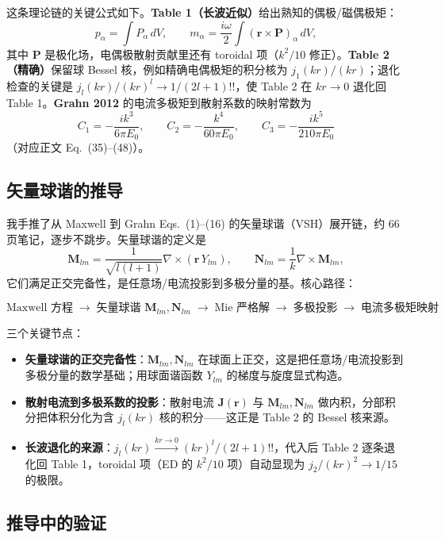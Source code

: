 这条理论链的关键公式如下。\textbf{Table 1（长波近似）}给出熟知的偶极/磁偶极矩：
\[
p_\alpha = \int P_\alpha\,dV,\qquad
m_\alpha = \frac{i\omega}{2}\int (\mathbf r\times\mathbf P)_\alpha\,dV,
\]
其中 $\mathbf P$ 是极化场，电偶极散射贡献里还有 toroidal 项（$k^2/10$ 修正）。\textbf{Table 2（精确）}保留球 Bessel 核，例如精确电偶极矩的积分核为 $j_1(kr)/(kr)$；退化检查的关键是 $j_l(kr)/(kr)^l\to1/(2l+1)!!$，使 Table 2 在 $kr\to0$ 退化回 Table 1。\textbf{Grahn 2012} 的电流多极矩到散射系数的映射常数为
\[
C_1=-\frac{ik^3}{6\pi E_0},\qquad
C_2=-\frac{k^4}{60\pi E_0},\qquad
C_3=-\frac{ik^5}{210\pi E_0}
\]
（对应正文 Eq.~(35)--(48)）。

\subsection{矢量球谐的推导}

我手推了从 Maxwell 到 Grahn Eqs.~(1)--(16) 的矢量球谐（VSH）展开链，约 66 页笔记，逐步不跳步。矢量球谐的定义是
\[
\mathbf M_{lm} = \frac{1}{\sqrt{l(l+1)}}\nabla\times(\mathbf r\,Y_{lm}),\qquad
\mathbf N_{lm} = \frac{1}{k}\nabla\times\mathbf M_{lm},
\]
它们满足正交完备性，是任意场/电流投影到多极分量的基。核心路径：

\[
\text{Maxwell 方程} \;\longrightarrow\; \text{矢量球谐 } \mathbf M_{lm},\mathbf N_{lm} \;\longrightarrow\; \text{Mie 严格解} \;\longrightarrow\; \text{多极投影} \;\longrightarrow\; \text{电流多极矩映射}
\]

三个关键节点：

\begin{itemize}
  \item \textbf{矢量球谐的正交完备性}：$\mathbf M_{lm},\mathbf N_{lm}$ 在球面上正交，这是把任意场/电流投影到多极分量的数学基础；用球面谐函数 $Y_{lm}$ 的梯度与旋度显式构造。
  \item \textbf{散射电流到多极系数的投影}：散射电流 $\mathbf J(\mathbf r)$ 与 $\mathbf M_{lm},\mathbf N_{lm}$ 做内积，分部积分把体积分化为含 $j_l(kr)$ 核的积分——这正是 Table 2 的 Bessel 核来源。
  \item \textbf{长波退化的来源}：$j_l(kr)\xrightarrow{kr\to0}(kr)^l/(2l+1)!!$，代入后 Table 2 逐条退化回 Table 1，toroidal 项（ED 的 $k^2/10$ 项）自动显现为 $j_2/(kr)^2\to1/15$ 的极限。
\end{itemize}

\subsection{推导中的验证}

